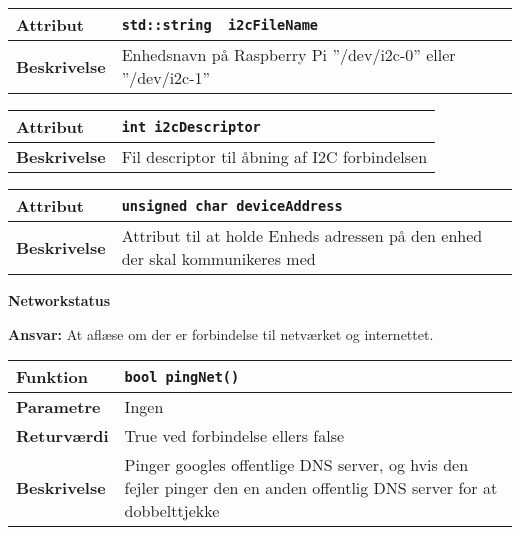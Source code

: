 \begin{center}
    \begin{tabular}{ | l | p{} |}
    \hline
    \textbf{Attribut}		& \verb+std::string  i2cFileName +								\\ \hline
    \textbf{Beskrivelse} 	& Enhedsnavn på Raspberry Pi ''/dev/i2c-0'' eller ''/dev/i2c-1''	\\ \hline
    \end{tabular}
\end{center}

\begin{center}
    \begin{tabular}{ | l | p{} |}
    \hline
    \textbf{Attribut}		& \verb+int i2cDescriptor +										\\ \hline
    \textbf{Beskrivelse} 	& Fil descriptor til åbning af I2C forbindelsen					\\ \hline
    \end{tabular}
\end{center}

\begin{center}
    \begin{tabular}{ | l | p{} |}
    \hline
    \textbf{Attribut}		& \verb+unsigned char deviceAddress + 								\\ \hline
    \textbf{Beskrivelse} 	& Attribut til at holde Enheds adressen på den enhed der skal kommunikeres med					\\ \hline
    \end{tabular}
\end{center}

{\centering
\textbf{Networkstatus}\par
}
\textbf{Ansvar:} At aflæse om der er forbindelse til netværket og internettet. \

\begin{center}
    \begin{tabular}{ | l | p{} |}
    \hline
    \textbf{Funktion}	& \verb+bool pingNet() +\\ \hline
    \textbf{Parametre} 	& Ingen \\ \hline
    \textbf{Returværdi}	& True ved forbindelse ellers false \\ \hline
    \textbf{Beskrivelse}	& Pinger googles offentlige DNS server, og hvis den fejler pinger den en anden offentlig DNS server for at dobbelttjekke\\ \hline
    \end{tabular}
\end{center}

